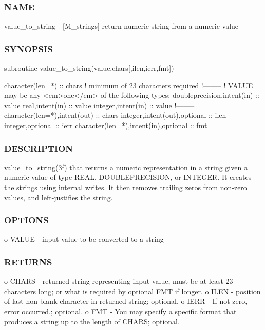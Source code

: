 \subsubsection*{N\+A\+ME}

value\+\_\+to\+\_\+string -\/ \mbox{[}M\+\_\+strings\mbox{]} return numeric string from a numeric value 

\subsubsection*{S\+Y\+N\+O\+P\+S\+IS}

\begin{DoxyVerb}subroutine value_to_string(value,chars[,ilen,ierr,fmt])

 character(len=*) :: chars  ! minimum of 23 characters required
 !--------
 ! VALUE may be any <em>one</em> of the following types:
 doubleprecision,intent(in)               :: value
 real,intent(in)                          :: value
 integer,intent(in)                       :: value
 !--------
 character(len=*),intent(out)             :: chars
 integer,intent(out),optional             :: ilen
 integer,optional                         :: ierr
 character(len=*),intent(in),optional     :: fmt
\end{DoxyVerb}


\subsubsection*{D\+E\+S\+C\+R\+I\+P\+T\+I\+ON}

\begin{DoxyVerb}value_to_string(3f)
that returns a numeric representation in a string given a numeric value of type
REAL, DOUBLEPRECISION, or INTEGER. It creates the strings using internal writes.
It then removes trailing zeros from non-zero values, and left-justifies the string.
\end{DoxyVerb}


\subsubsection*{O\+P\+T\+I\+O\+NS}

o V\+A\+L\+UE -\/ input value to be converted to a string \subsubsection*{R\+E\+T\+U\+R\+NS}

o C\+H\+A\+RS -\/ returned string representing input value, must be at least 23 characters long; or what is required by optional F\+MT if longer. o I\+L\+EN -\/ position of last non-\/blank character in returned string; optional. o I\+E\+RR -\/ If not zero, error occurred.; optional. o F\+MT -\/ You may specify a specific format that produces a string up to the length of C\+H\+A\+RS; optional.


